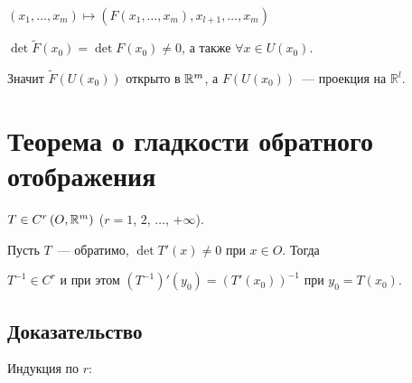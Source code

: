 \documentclass{article}
\begin{document}
            $(x_1, \ldots, x_m) \mapsto \left( F(x_1, \ldots, x_m), x_{l + 1}, \ldots, x_m \right)$
            
            $\det \widetilde{F}(x_0) = \det F(x_0) \neq 0$, а также $\forall x \in U(x_0)$. 
            
            Значит $\widetilde{F}(U(x_0))$ открыто в $\mathbb{R}^m$, а $F(U(x_0))$~--- проекция на $\mathbb{R}^l$.
            
    \newpage
    
    \section{Теорема о гладкости обратного отображения}
    
        $T \in C^r \left( O, \mathbb{R}^m \right)$ ($r = 1$, $2$, $\ldots$, $+\infty$).
        
        Пусть $T$~--- обратимо, $\det T'(x) \neq 0$ при $x \in O$. Тогда
        
        $T^{-1} \in C^r$ и при этом $\left( T^{-1} \right)'(y_0) = \left( T'(x_0) \right)^{-1}$ при $y_0 = T(x_0)$.
        
        \subsection{Доказательство}
        
            Индукция по $r$:
            
\end{document}

